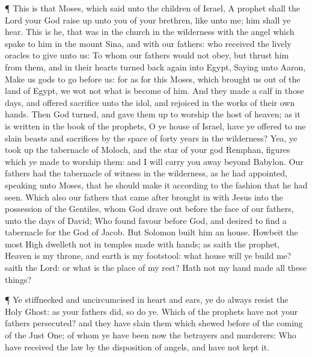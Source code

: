  ¶ This is that Moses, which said unto the children of
Israel, A prophet shall the Lord your God raise up unto you of your
brethren, like unto me; him shall ye hear.  This is he,
that was in the church in the wilderness with the angel which spake to
him in the mount Sina, and with our fathers: who received the lively
oracles to give unto us:  To whom our fathers would not
obey, but thrust him from them, and in their hearts turned back again
into Egypt,  Saying unto Aaron, Make us gods to go before
us: for as for this Moses, which brought us out of the land of Egypt, we
wot not what is become of him.  And they made a calf in
those days, and offered sacrifice unto the idol, and rejoiced in the
works of their own hands.  Then God turned, and gave them
up to worship the host of heaven; as it is written in the book of the
prophets, O ye house of Israel, have ye offered to me slain beasts and
sacrifices by the space of forty years in the wilderness? 
Yea, ye took up the tabernacle of Moloch, and the star of your god
Remphan, figures which ye made to worship them: and I will carry you
away beyond Babylon.  Our fathers had the tabernacle of
witness in the wilderness, as he had appointed, speaking unto Moses,
that he should make it according to the fashion that he had seen.
 Which also our fathers that came after brought in with
Jesus into the possession of the Gentiles, whom God drave out before the
face of our fathers, unto the days of David;  Who found
favour before God, and desired to find a tabernacle for the God of
Jacob.  But Solomon built him an house. 
Howbeit the most High dwelleth not in temples made with hands; as saith
the prophet,  Heaven is my throne, and earth is my
footstool: what house will ye build me? saith the Lord: or what is the
place of my rest?  Hath not my hand made all these things?

 ¶ Ye stiffnecked and uncircumcised in heart and ears, ye
do always resist the Holy Ghost: as your fathers did, so do ye.
 Which of the prophets have not your fathers persecuted?
and they have slain them which shewed before of the coming of the Just
One; of whom ye have been now the betrayers and murderers: 
Who have received the law by the disposition of angels, and have not
kept it.

